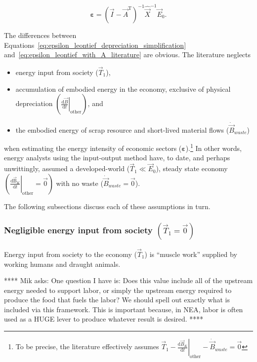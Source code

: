 \begin{equation} \label{eq:epsilon_leontief_with_A_literature}
	\bm{\varepsilon} 
	= {(\vec{I} - \vec{A}^{\mathrm{T}})}^{-1}
	\hat{\vec{X}}^{-1}
	\vec{E}_{0}.
\end{equation}

The differences between Equations~\ref{eq:epsilon_leontief_depreciation_simplification}
and~\ref{eq:epsilon_leontief_with_A_literature} are obvious. 
The literature neglects
\begin{itemize}
	\item{energy input from society ($\vec{T}_{1}$),}
	\item{accumulation of embodied energy in the economy,
			exclusive of physical depreciation 
			$\left( \left. \frac{\mathrm{d}\vec{B}}{\mathrm{d}t} \right|_{\mathrm{other}} \right)$,
			and}
	\item{the embodied energy of scrap resource	and short-lived material flows 
			($\dot{\vec{B}}_{waste}$)}
\end{itemize}

\noindent{}when estimating the energy intensity  
of economic sectors ($\bm{\varepsilon}$).\footnote{To be precise, 
the literature effectively assumes
$
	\vec{T}_{1}
	- \left. \frac{\mathrm{d}\vec{B}_{K}}{\mathrm{d}t} \right|_{\mathrm{other}}
	- \dot{\vec{B}}_{waste}
	= \vec{0}
$}
In other words, energy analysts using the input-output method
have, to date, and perhaps unwittingly, assumed 
a developed-world ($\vec{T}_{1} \ll \vec{E}_{0}$), 
steady state economy
$\left( \left. \frac{\mathrm{d}\mathrm{\vec{B}}_{K}}{\mathrm{d}t} \right|_{\mathrm{other}} 
= \vec{0} \right)$ with no waste ($\dot{\vec{B}}_{waste} = \vec{0}$).

The following subsections discuss each of these assumptions in turn.


\subsubsection{Negligible energy input from society $\left( \vec{T}_{1} = \vec{0} \right)$}

Energy input from society to the economy ($\vec{T}_{1}$)
is ``muscle work'' supplied by working humans 
and draught animals.\cite{Ayres:2003ec,Ayres:2010ug,Warr:2012cg} 

**** Mik asks: One question I have is:
Does this value include all of the upstream energy needed to support labor, 
or simply the upstream energy required to produce the food that fuels the labor?
We should spell out exactly what is included via this framework. 
This is important because, in NEA, labor is often used 
as a HUGE lever to produce whatever result is desired.
****

